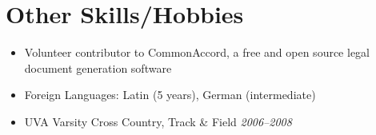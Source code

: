 \documentclass[a4paper,11pt]{article}
\begin{document}

\vskip 4pt
\section*{Other Skills/Hobbies}
\vskip 5pt

  \begin{itemize}
    \item Volunteer contributor to CommonAccord, a free and open source legal document generation
      software
    \item Foreign Languages: Latin (5 years), German (intermediate)
    \item UVA Varsity Cross Country, Track \& Field \hfill \textit{2006--2008}
  \end{itemize}
\end{document}
